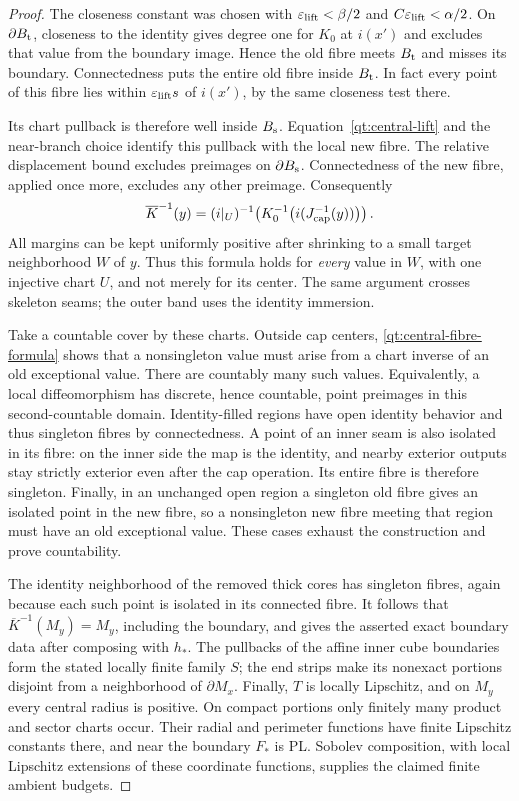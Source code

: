 \documentclass[11pt]{article}
\numberwithin{equation}{section}
\theoremstyle{definition}
\theoremstyle{remark}
\begin{document}
\begin{proof}
The closeness constant was chosen with
$\varepsilon_{\rm lift}<\beta/2$ and
$C\varepsilon_{\rm lift}<\alpha/2$.  On $\partial B_{\rm t}$,
closeness to the identity gives degree one for $K_0$ at $i(x')$
and excludes that value from the boundary image.  Hence the old
fibre meets $B_{\rm t}$ and misses its boundary.  Connectedness
puts the entire old fibre inside $B_{\rm t}$.  In fact every point
of this fibre lies within
$\varepsilon_{\rm lift}s$ of $i(x')$, by the same closeness test there.

Its chart pullback is therefore well inside $B_{\rm s}$.
Equation~\eqref{qt:central-lift} and the near-branch choice identify
this pullback with the local new fibre.  The relative displacement
bound excludes preimages on $\partial B_{\rm s}$.  Connectedness
of the new fibre, applied once more, excludes any other preimage.
Consequently
\begin{equation}\label{qt:central-fibre-formula}
 \overline K^{-1}(y)
   =(i|_U)^{-1}\!\left(K_0^{-1}
          \bigl(i(J_{\rm cap}^{-1}(y))\bigr)\right).
\end{equation}
All margins can be kept uniformly positive after shrinking to a
small target neighborhood $W$ of $y$.  Thus this formula holds for
\emph{every} value in $W$, with one injective chart $U$, and not
merely for its center.  The same argument crosses skeleton seams;
the outer band uses the identity immersion.

Take a countable cover by these charts.  Outside cap centers,
\eqref{qt:central-fibre-formula} shows that a nonsingleton value
must arise from a chart inverse of an old exceptional value.  There
are countably many such values.  Equivalently, a local diffeomorphism
has discrete, hence countable, point preimages in this second-countable
domain.  Identity-filled regions have open identity behavior and
thus singleton fibres by connectedness.  A point of an inner seam
is also isolated in its fibre: on the inner side the map is the
identity, and nearby exterior outputs stay strictly exterior even
after the cap operation.  Its entire fibre is therefore singleton.
Finally, in an unchanged open region a singleton old fibre gives
an isolated point in the new fibre, so a nonsingleton new fibre
meeting that region must have an old exceptional value.  These
cases exhaust the construction and prove countability.

The identity neighborhood of the removed thick cores has singleton
fibres, again because each such point is isolated in its connected
fibre.  It follows that $\overline K^{-1}(M_y)=M_y$, including the
boundary, and gives the asserted exact boundary data after composing
with $h_*$.  The pullbacks of the affine inner cube boundaries form
the stated locally finite family $S$; the end strips make its
nonexact portions disjoint from a neighborhood of $\partial M_x$.
Finally, $T$ is locally Lipschitz, and on $M_y$ every central radius
is positive.  On compact portions only finitely many product and
sector charts occur.  Their radial and perimeter functions have
finite Lipschitz constants there, and near the boundary $F_*$ is
PL.  Sobolev composition, with local Lipschitz extensions of these
coordinate functions, supplies the claimed finite ambient budgets.
\end{proof}
\end{document}
